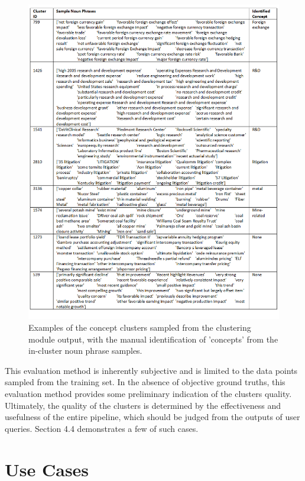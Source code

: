 \begin{figure}[h!]
\centering
  \includegraphics[width=\textwidth]{figures/cluster_samples.png}
  \caption{Examples of the concept clusters sampled from the clustering module output, with the manual identification of 'concepts' from the in-cluster noun phrase samples.}
  \label{fig:cluster_samples}
\end{figure}


This evaluation method is inherently subjective and is limited to the data points sampled from the training set. In the absence of objective ground truths, this evaluation method provides some preliminary indication of the clusters quality. Ultimately, the quality of the clusters is determined by the effectiveness and usefulness of the entire pipeline, which should be judged from the outputs of user queries. Section 4.4 demonstrates a few of such cases.



\section{Use Cases} 

